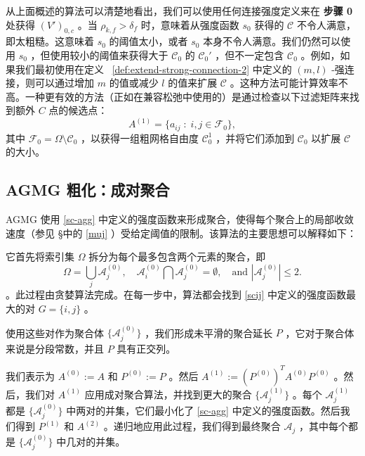 \documentclass[12pt]{acta_2011xz}
\begin{document}
从上面概述的算法可以清楚地看出，我们可以使用任何连接强度定义来在  {    \bf    步骤 0   }  处获得    $(V')_{0, c}$    。当    $\rho_{k,f}>\delta_f$    时，意味着从强度函数    $s_0$    获得的
   $\mathcal C$    不令人满意，即太粗糙。这意味着    $s_0$    的阈值太小，或者    $s_0$    本身不令人满意。我们仍然可以使用
   $s_0$   ，但使用较小的阈值来获得大于    $\mathcal C_0$    的    $\mathcal C_0'$    ，但不一定包含    $\mathcal
C_0$    。例如，如果我们最初使用在定义~    \ref{def:extend-strong-connection-2}    中定义的    $(m, l)$    -强连接，则可以通过增加    $m$    的值或减少
   $l$    的值来扩展    $\mathcal C$    。这种方法可能计算效率不高。一种更有效的方法（正如在兼容松弛中使用的）是通过检查以下过滤矩阵来找到额外    $C$    点的候选点：
   $$
A^{(1)}=\bigg \{ a_{ij}\;:\; i, j\in \mathcal F_0\bigg \} ,
$$    其中    $\mathcal F_0=\Omega \setminus \mathcal C_0$    ，以获得一组粗网格自由度    $\mathcal C_0^{1}$    ，并将它们添加到    $\mathcal C_0$    以扩展    $\mathcal C$    的大小。  

   \subsection{AGMG 粗化：成对聚合  }       \label{s:agmg-not}     

AGMG 使用    \eqref{sc-agg}    中定义的强度函数来形成聚合，使得每个聚合上的局部收敛速度（参见    \S    中的    \eqref{muj}    ）受给定阈值的限制。该算法的主要思想可以解释如下：  

它首先将索引集    $\Omega$    拆分为每个最多包含两个元素的聚合，即
   \begin{equation}
  \Omega =\bigcup_{j}\mathcal A_j^{(0)}, \quad \mathcal A_i^{(0)}\bigcap \mathcal A_j^{(0)}=\emptyset, \quad \text{and } |\mathcal A_j^{(0)}|\le 2.
\end{equation}   。此过程由贪婪算法完成。在每一步中，算法都会找到    \eqref{scij}    中定义的强度函数最大的对    $G= \{ i, j \} $   。  

使用这些对作为聚合体    $ \{ \mathcal A_j^{(0)} \} $    ，我们形成未平滑的聚合延长    $P$    ，它对于聚合体来说是分段常数，并且    $P$    具有正交列。  

我们表示为    $A^{(0)}:=A$    和    $P^{(0)}:=P$    。然后
   $A^{(1)}:=(P^{(0)})^TA^{(0)}P^{(0)}$    。然后，我们对    $A^{(1)}$    应用成对聚合算法，并找到更大的聚合
   $ \{ \mathcal A_j^{(1)} \} $    。每个    $\mathcal A_j^{(1)}$    都是    $ \{ \mathcal A_j^{(0)} \} $    中两对的并集，它们最小化了    \eqref{sc-agg}    中定义的强度函数。然后我们得到    $P^{(1)}$    和    $A^{(2)}$    。递归地应用此过程，我们得到最终聚合    $\mathcal A_j$    ，其中每个都是    $ \{ \mathcal A_j^{(0)} \} $    中几对的并集。  
\end{document}
